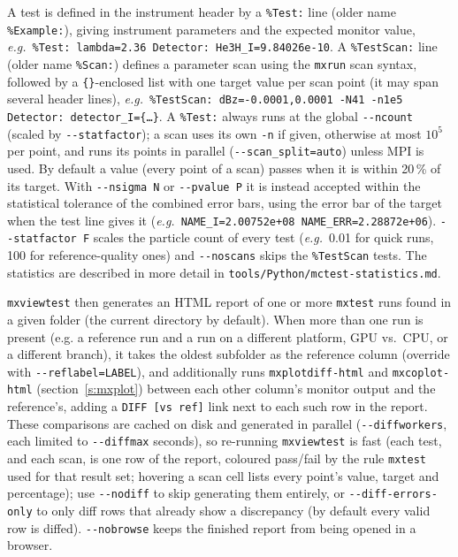 A test is defined in the instrument header by a \texttt{\%Test:} line (older name
\texttt{\%Example:}), giving instrument parameters and the expected monitor value,
\textit{e.g.}\ \texttt{\%Test: lambda=2.36 Detector: He3H\_I=9.84026e-10}. A
\texttt{\%TestScan:} line (older name \texttt{\%Scan:}) defines a parameter scan
using the \verb+mxrun+ scan syntax, followed by a \texttt{\{\}}-enclosed list with one
target value per scan point (it may span several header lines), \textit{e.g.}\
\texttt{\%TestScan: dBz=-0.0001,0.0001 -N41 -n1e5 Detector: detector\_I=\{\ldots\}}.
A \texttt{\%Test:} always runs at the global \verb+--ncount+ (scaled by
\verb+--statfactor+); a scan uses its own \texttt{-n} if given, otherwise at most
$10^5$ per point, and runs its points in parallel (\verb+--scan_split=auto+) unless
MPI is used. By default a value (every point of a scan) passes when it is within
20\,\% of its target. With \verb+--nsigma N+ or \verb+--pvalue P+ it is instead
accepted within the statistical tolerance of the combined error bars, using the
error bar of the target when the test line gives it
(\textit{e.g.}\ \texttt{NAME\_I=2.00752e+08 NAME\_ERR=2.28872e+06}).
\verb+--statfactor F+ scales the particle count of every test (\textit{e.g.}\ 0.01 for
quick runs, 100 for reference-quality ones) and \verb+--noscans+ skips the
\texttt{\%TestScan} tests. The statistics are described in more detail in
\texttt{tools/Python/mctest-statistics.md}.

\verb+mxviewtest+ then generates an HTML report of one or more \verb+mxtest+
runs found in a given folder (the current directory by default). When more
than one run is present (e.g. a reference run and a run on a different
platform, GPU vs.\ CPU, or a different \MCX branch), it takes the oldest
subfolder as the reference column (override with \verb+--reflabel=LABEL+), and
additionally runs \texttt{mxplotdiff-html} and \texttt{mxcoplot-html}
(section~\ref{s:mxplot}) between each other column's monitor output and the
reference's, adding a \texttt{DIFF~[vs~ref]} link next to each such row in the
report. These comparisons are cached on disk and generated in parallel
(\verb+--diffworkers+, each limited to \verb+--diffmax+ seconds), so
re-running \verb+mxviewtest+ is fast (each test, and each scan, is one row of the report, coloured pass/fail by the rule \verb+mxtest+ used for that result set; hovering a scan cell lists every point's value, target and percentage); use \verb+--nodiff+ to skip generating
them entirely, or \verb+--diff-errors-only+ to only diff rows that already show
a discrepancy (by default every valid row is diffed). \verb+--nobrowse+ keeps
the finished report from being opened in a browser.

